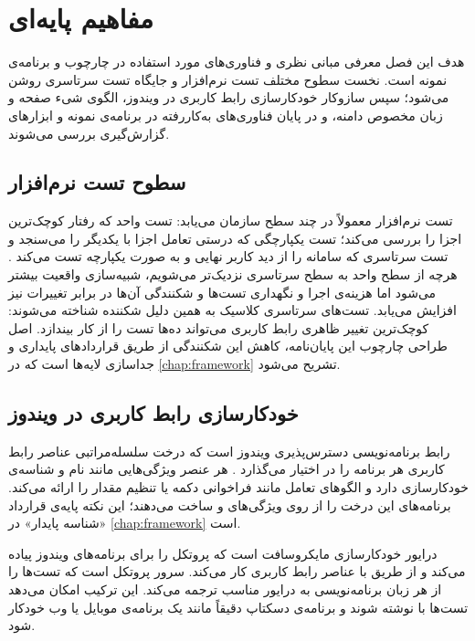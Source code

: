 \chapter{مفاهیم پایه‌ای}
\label{chap:concepts}

هدف این فصل معرفی مبانی نظری و فناوری‌های مورد استفاده در چارچوب و برنامه‌ی نمونه است. نخست سطوح مختلف تست نرم‌افزار و جایگاه تست سرتاسری روشن می‌شود؛ سپس سازوکار خودکارسازی رابط کاربری در ویندوز، الگوی شیء صفحه و زبان مخصوص دامنه، و در پایان فناوری‌های به‌کاررفته در برنامه‌ی نمونه و ابزارهای گزارش‌گیری بررسی می‌شوند.

\section{سطوح تست نرم‌افزار}
تست نرم‌افزار معمولاً در چند سطح سازمان می‌یابد: تست واحد که رفتار کوچک‌ترین اجزا را بررسی می‌کند؛ تست یکپارچگی که درستی تعامل اجزا با یکدیگر را می‌سنجد و تست سرتاسری
که سامانه را از دید کاربر نهایی و به صورت یکپارچه تست می‌کند
\cite{crispin2009}. هرچه از سطح واحد به سطح سرتاسری نزدیک‌تر می‌شویم، شبیه‌سازی واقعیت بیشتر می‌شود اما هزینه‌ی اجرا و نگهداری تست‌ها و شکنندگی آن‌ها در برابر تغییرات نیز افزایش می‌یابد. تست‌های سرتاسری کلاسیک به همین دلیل شکننده شناخته می‌شوند: کوچک‌ترین تغییر ظاهری رابط کاربری می‌تواند ده‌ها تست را از کار بیندازد. اصل طراحی چارچوب این پایان‌نامه، کاهش این شکنندگی از طریق قراردادهای پایداری و جداسازی لایه‌ها است که در \autoref{chap:framework}
تشریح می‌شود.

\section{خودکارسازی رابط کاربری در ویندوز}
رابط برنامه‌نویسی دسترس‌پذیری ویندوز است که درخت سلسله‌مراتبی عناصر رابط کاربری هر برنامه را در اختیار می‌گذارد
\cite{uia}. هر عنصر ویژگی‌هایی مانند نام
و شناسه‌ی خودکارسازی
دارد و الگوهای تعامل مانند فراخوانی دکمه یا تنظیم مقدار را ارائه می‌کند. برنامه‌های
این درخت را از روی ویژگی‌های
و
ساخت می‌دهند؛ این نکته پایه‌ی قرارداد «شناسه پایدار» در \autoref{chap:framework}
است.

\cite{winappdriver}
درایور خودکارسازی مایکروسافت است که پروتکل
را برای برنامه‌های ویندوز پیاده می‌کند و از طریق
با عناصر رابط کاربری کار می‌کند.
\cite{appium}
سرور پروتکل است که تست‌ها را از هر زبان برنامه‌نویسی به درایور مناسب ترجمه می‌کند. این ترکیب امکان می‌دهد تست‌ها با
نوشته شوند و برنامه‌ی دسکتاپ دقیقاً مانند یک برنامه‌ی موبایل یا وب خودکار شود.

